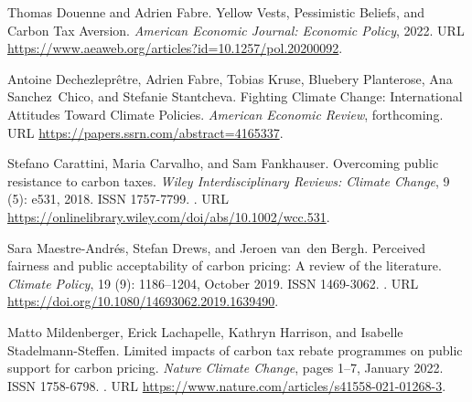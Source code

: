 \documentclass[12pt,english]{article}
\begin{document}
\begin{thebibliography}{55}
  Thomas Douenne and Adrien Fabre.
  \newblock Yellow {{Vests}}, {{Pessimistic Beliefs}}, and {{Carbon Tax
    Aversion}}.
  \newblock \emph{American Economic Journal: Economic Policy}, 2022.
  \newblock URL \url{https://www.aeaweb.org/articles?id=10.1257/pol.20200092}.
  
  Antoine Dechezlepr{\^e}tre, Adrien Fabre, Tobias Kruse, Bluebery Planterose,
    Ana Sanchez~Chico, and Stefanie Stantcheva.
  \newblock Fighting {{Climate Change}}: {{International Attitudes Toward Climate
    Policies}}.
  \newblock \emph{American Economic Review}, forthcoming.
  \newblock URL \url{https://papers.ssrn.com/abstract=4165337}.
  
  Stefano Carattini, Maria Carvalho, and Sam Fankhauser.
  \newblock Overcoming public resistance to carbon taxes.
  \newblock \emph{Wiley Interdisciplinary Reviews: Climate Change}, 9
    (5): e531, 2018.
  \newblock ISSN 1757-7799.
  \newblock {}.
  \newblock URL \url{https://onlinelibrary.wiley.com/doi/abs/10.1002/wcc.531}.
  
  Sara {Maestre-Andr{\'e}s}, Stefan Drews, and Jeroen van~den Bergh.
  \newblock Perceived fairness and public acceptability of carbon pricing: A
    review of the literature.
  \newblock \emph{Climate Policy}, 19 (9): 1186--1204, October
    2019.
  \newblock ISSN 1469-3062.
  \newblock {}.
  \newblock URL \url{https://doi.org/10.1080/14693062.2019.1639490}.
  
  Matto Mildenberger, Erick Lachapelle, Kathryn Harrison, and Isabelle
    {Stadelmann-Steffen}.
  \newblock Limited impacts of carbon tax rebate programmes on public support for
    carbon pricing.
  \newblock \emph{Nature Climate Change}, pages 1--7, January 2022.
  \newblock ISSN 1758-6798.
  \newblock {}.
  \newblock URL \url{https://www.nature.com/articles/s41558-021-01268-3}.
  

\end{thebibliography}
\end{document}
